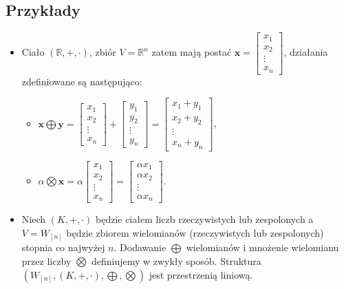 \documentclass{article}
\begin{document}
\subsection{Przykłady}
\begin{itemize}
    \item Ciało $(\mathbb{R}, +, \cdot)$, zbiór $V=\mathbb{R}^{n}$ zatem mają postać $\mathbf{x} = \begin{bmatrix} x_{1} \\ x_{2} \\ \vdots \\ x_{n} \end{bmatrix}$, działania zdefiniowane są następująco:
        \begin{itemize}
            \item $\mathbf{x}\bigoplus\mathbf{y} = \begin{bmatrix} x_{1} \\ x_{2} \\ \vdots \\ x_{n} \end{bmatrix} + \begin{bmatrix} y_{1} \\ y_{2} \\ \vdots \\ y_{n} \end{bmatrix} = \begin{bmatrix} x_{1} + y_{1} \\ x_{2} + y_{2} \\ \vdots \\ x_{n} + y_{n} \end{bmatrix}$,
            \item $\alpha\bigotimes\mathbf{x} = \alpha \begin{bmatrix} x_{1} \\ x_{2} \\ \vdots \\ x_{n} \end{bmatrix} = \begin{bmatrix}  \alpha x_{1} \\  \alpha x_{2} \\ \vdots \\  \alpha x_{n} \end{bmatrix}$.
        \end{itemize}

    \item Niech $(K,+,\cdot)$ będzie ciałem liczb rzeczywistych lub zespolonych a~$V=W_{[n]}$ będzie zbiorem wielomianów (rzeczywistych lub zespolonych) stopnia co najwyżej $n$.
        Dodawanie $\bigoplus$ wielomianów i mnożenie wielomianu przez liczby $\bigotimes$ definiujemy w zwykły sposób.
        Struktura $(W_{[n]},(K,+,\cdot), \bigoplus,\bigotimes)$ jest przestrzenią liniową.


\end{itemize}
\end{document}

